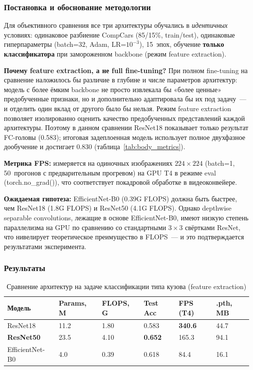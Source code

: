\documentclass[10pt,a4paper]{report}
\numberwithin{equation}{chapter}
\numberwithin{figure}{chapter}
\numberwithin{table}{chapter}
\begin{document}
\subsubsection{Постановка и обоснование методологии}

Для объективного сравнения все три архитектуры обучались
в \emph{идентичных} условиях: одинаковое разбиение CompCars (85/15\%, train/test),
одинаковые гиперпараметры (batch=32, Adam, LR=$10^{-3}$), 15~эпох,
обучение \textbf{только классификатора} при замороженном backbone
(режим feature extraction).

\textbf{Почему feature extraction, а не full fine-tuning?}
При полном fine-tuning на сравнение наложилось бы различие в
глубине и числе параметров архитектур: модель с более ёмким
backbone не просто извлекала бы «более ценные» предобученные
признаки, но и дополнительно адаптировала бы их под задачу~---
и отделить один вклад от другого было бы нельзя. Режим feature
extraction позволяет изолированно оценить качество
предобученных представлений каждой архитектуры. Поэтому в данном
сравнении ResNet18 показывает только результат FC-головы (0.583);
итоговая задеплоенная модель использует полное двухфазное
дообучение и достигает 0.830 (таблица~\ref{tab:body_metrics}).

\textbf{Метрика FPS:} измеряется на одиночных изображениях
$224\times224$ (batch=1, 50~прогонов с предварительным прогревом)
на GPU T4 в режиме eval (torch.no\_grad()), что соответствует
покадровой обработке в видеоконвейере.

\textbf{Ожидаемая гипотеза:} EfficientNet-B0 (0.39G FLOPS) должна
быть быстрее, чем ResNet18 (1.8G FLOPS) и ResNet50 (4.1G FLOPS).
Однако depthwise separable convolutions, лежащие в основе
EfficientNet-B0, имеют низкую степень параллелизма на GPU по
сравнению со стандартными $3\times3$ свёртками ResNet, что
нивелирует теоретическое преимущество в FLOPS~--- и это
подтверждается результатами эксперимента.

\subsubsection{Результаты}

\begin{table}[H]
\centering
\caption{Сравнение архитектур на задаче классификации типа кузова (feature extraction)}
\label{tab:arch_comparison}
\small
\begin{tabularx}{\textwidth}{lXXXXX}
\toprule
\textbf{Модель} & \textbf{Params, M} & \textbf{FLOPS, G} & \textbf{Test Acc} & \textbf{FPS (T4)} & \textbf{.pth, MB} \\
\midrule
ResNet18              & 11.2 & 1.80 & 0.583          & \textbf{340.6} & 44.7 \\
\textbf{ResNet50}     & 23.5 & 4.10 & \textbf{0.652} & 165.3          & 94.1 \\
EfficientNet-B0       &  4.0 & 0.39 & 0.618          &  84.4          & 16.1 \\
\bottomrule
\end{tabularx}
\end{table}
\end{document}
